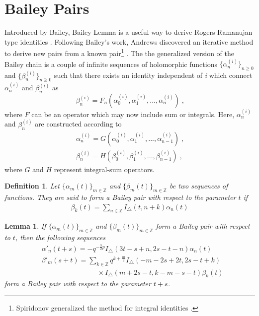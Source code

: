 \documentclass[11pt,a4paper]{article}
\newtheorem{lemma}[theorem]{Lemma}
\newtheorem{definition}{Definition}[section]
\begin{document}
\section{Bailey Pairs}


Introduced by Bailey, Bailey Lemma is a useful way to derive Rogers-Ramanujan type identities \cite{Bailey1946SomeII, Bailey1948IdentitiesOT}. Following Bailey's work, Andrews discovered an iterative method to derive new pairs from a known pair\footnote{ Spiridonov generalized the method for integral identities \cite{Spiridonov2003ABT, Spiridonov2002AnEI}.} \cite{Andrews1984MULTIPLESR}. The the generalized version of the Bailey chain is a couple of infinite sequences of holomorphic functions $\{\alpha^{(i)}_n\}_{n \geq 0}$ and $\{\beta^{(i)}_n\}_{n \geq 0}$ such that there exists an identity independent of \textit{i} which connect $\alpha^{(i)}_n$ and $\beta^{(i)}_n$ as
\begin{equation}
    \beta^{(i)}_n=F_n(\alpha^{(i)}_0, \alpha^{(i)}_1,..., \alpha^{(i)}_n) \; \text{,}
\end{equation}
where $F$ can be an operator which may now include sum or integrals. Here, $\alpha^{(i)}_n$ and $\beta^{(i)}_n$ are constructed according to
\begin{align}
    \alpha^{(i)}_n=G(\alpha^{(i)}_0, \alpha^{(i)}_1,..., \alpha^{(i)}_{n-1}) \; \text{,}\\
    \beta^{(i)}_n=H(\beta^{(i)}_0, \beta^{(i)}_1,..., \beta^{(i)}_{n-1}) \; \text{,}
\end{align}
where $G$ and $H$ represent integral-sum operators.
\begin{definition}
Let $\{\alpha_m(t)\}_{m \in \mathbb{Z}}$ and $\{\beta_m(t)\}_{m \in \mathbb{Z}}$ be two sequences of functions. They are said to form a Bailey pair with respect to the parameter $t$ if
\begin{align}\label{baileydef1}
        \beta_k (t)= \sum_{n \in \mathbb{Z}} I_{\triangle}(t, n + k) \alpha_n(t)
\end{align}
\end{definition}
\begin{lemma}
If $\{\alpha_m(t)\}_{m \in \mathbb{Z}}$ and $\{\beta_m(t)\}_{m \in \mathbb{Z}}$ form a Bailey pair with respect to $t$, then the following sequences
\begin{align}
            & \alpha'_n(t + s)= -q^{-\frac{3}{2}p} I_{\triangle}(3t - s + n,2s - t  - n)\alpha_n(t) \label{baileydef_a} \\ 
            & \nonumber \beta'_m(s + t)=\sum_{k \in \mathbb{Z}}q^{k + \frac{m}{2}}  I_{\triangle}(-m - 2s + 2t,2s - t + k) \\
            & \qquad \qquad \qquad \qquad \times I_{\triangle}(m + 2s - t,k - m - s - t) \beta_k(t)
            \label{baileydef2}
\end{align}
\vspace{-0.5cm}
form a Bailey pair with respect to the parameter $t + s$.
\end{lemma}
\end{document}

